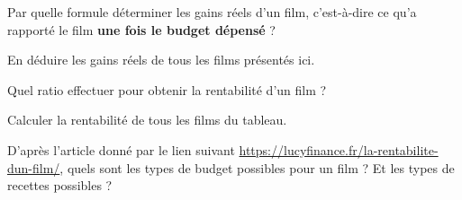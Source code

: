 \documentclass{article}
\begin{document}
\begin{enumquestions}
\item Par quelle formule déterminer les gains réels d'un film, c'est-à-dire ce qu'a rapporté le film \textbf{une fois le budget dépensé} ?
\item En déduire les gains réels de tous les films présentés ici.
\item Quel ratio effectuer pour obtenir la rentabilité d'un film ?
\item Calculer la rentabilité de tous les films du tableau.
\item D'après l'article donné par le lien suivant \url{https://lucyfinance.fr/la-rentabilite-dun-film/}, quels sont les types de budget possibles pour un film ? Et les types de recettes possibles ?
\end{enumquestions}

\emptybox{5cm}
\end{document}
